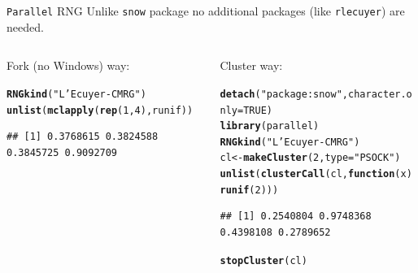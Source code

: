 \documentclass[aspectratio=169]{beamer}\usepackage[]{graphicx}\usepackage[]{color}
\makeatletter
\newcommand{\hlnum}[1]{\textcolor[rgb]{0.686,0.059,0.569}{#1}}%
\newcommand{\hlstr}[1]{\textcolor[rgb]{0.192,0.494,0.8}{#1}}%
\newcommand{\hlstd}[1]{\textcolor[rgb]{0.345,0.345,0.345}{#1}}%
\newcommand{\hlkwa}[1]{\textcolor[rgb]{0.161,0.373,0.58}{\textbf{#1}}}%
\newcommand{\hlkwb}[1]{\textcolor[rgb]{0.69,0.353,0.396}{#1}}%
\newcommand{\hlkwc}[1]{\textcolor[rgb]{0.333,0.667,0.333}{#1}}%
\newcommand{\hlkwd}[1]{\textcolor[rgb]{0.737,0.353,0.396}{\textbf{#1}}}%
\newenvironment{kframe}{%
 \def\at@end@of@kframe{}%
 \ifinner\ifhmode%
  \def\at@end@of@kframe{\end{minipage}}%
  \begin{minipage}{\columnwidth}%
 \fi\fi%
 \def\FrameCommand##1{\hskip\@totalleftmargin \hskip-\fboxsep
 \colorbox{shadecolor}{##1}\hskip-\fboxsep
     \hskip-\linewidth \hskip-\@totalleftmargin \hskip\columnwidth}%
 \MakeFramed {\advance\hsize-\width
   \@totalleftmargin\z@ \linewidth\hsize
   \@setminipage}}%
 {\par\unskip\endMakeFramed%
 \at@end@of@kframe}
\newenvironment{knitrout}{}{} %
\makeatother
\begin{document}
\begin{frame}[fragile]{\texttt{Parallel} RNG}
  Unlike \texttt{snow} package no additional packages (like \texttt{rlecuyer}) are needed.
  \begin{columns}[T]
    \begin{column}{.48\textwidth}
        Fork (no Windows) way:

\begin{knitrout}\scriptsize
{}\color{fgcolor}\begin{kframe}
\begin{alltt}
\hlkwd{RNGkind}\hlstd{(}\hlstr{"L'Ecuyer-CMRG"}\hlstd{)}
\hlkwd{unlist}\hlstd{(}\hlkwd{mclapply}\hlstd{(}\hlkwd{rep}\hlstd{(}\hlnum{1}\hlstd{,}\hlnum{4}\hlstd{), runif))}
\end{alltt}
\begin{verbatim}
## [1] 0.3768615 0.3824588 0.3845725 0.9092709
\end{verbatim}
\end{kframe}
\end{knitrout}
    \end{column}
    \begin{column}{.48\textwidth}
        Cluster way:
\begin{knitrout}\scriptsize
{}\color{fgcolor}\begin{kframe}
\begin{alltt}
\hlkwd{detach}\hlstd{(}\hlstr{"package:snow"}\hlstd{,} \hlkwc{character.only}\hlstd{=}\hlnum{TRUE}\hlstd{)}
\hlkwd{library}\hlstd{(parallel)}
\hlkwd{RNGkind}\hlstd{(}\hlstr{"L'Ecuyer-CMRG"}\hlstd{)}
\hlstd{cl} \hlkwb{<-} \hlkwd{makeCluster}\hlstd{(}\hlnum{2}\hlstd{,} \hlkwc{type}\hlstd{=}\hlstr{"PSOCK"}\hlstd{)}
\hlkwd{unlist}\hlstd{(}\hlkwd{clusterCall}\hlstd{(cl,} \hlkwa{function}\hlstd{(}\hlkwc{x}\hlstd{)} \hlkwd{runif}\hlstd{(}\hlnum{2}\hlstd{)))}
\end{alltt}
\begin{verbatim}
## [1] 0.2540804 0.9748368 0.4398108 0.2789652
\end{verbatim}
\begin{alltt}
\hlkwd{stopCluster}\hlstd{(cl)}
\end{alltt}
\end{kframe}
\end{knitrout}

    \end{column}
  \end{columns}
\end{frame}
\end{document}
